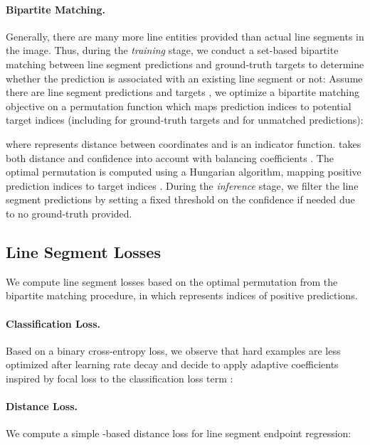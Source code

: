 \documentclass[final]{cvpr}
\begin{document}
\paragraph{Bipartite Matching.} Generally, there are many more line entities provided than actual line segments in the image. Thus, during the \textit{training} stage, we conduct a set-based bipartite matching between line segment predictions and ground-truth targets to determine whether the prediction is associated with an existing line segment or not: Assume there are  line segment predictions  and  targets , we optimize a bipartite matching objective on a permutation function  which maps prediction indices  to potential target indices  (including  for ground-truth targets and  for unmatched predictions):
\vspace{-3mm}

where  represents  distance between coordinates and  is an indicator function.  takes both distance and confidence into account with balancing coefficients . The optimal permutation  is computed using a Hungarian algorithm, mapping  positive prediction indices to target indices . During the \textit{inference} stage, we filter the  line segment predictions by setting a fixed threshold on the confidence  if needed due to no ground-truth provided.

\subsection{Line Segment Losses}
\vspace{-2mm}
We compute line segment losses based on the optimal permutation  from the bipartite matching procedure, in which  represents indices of positive predictions.
\vspace{-2mm}
\paragraph{Classification Loss.} Based on a binary cross-entropy loss, we observe that hard examples are less optimized after learning rate decay and decide to apply adaptive coefficients inspired by focal loss \cite{FocalLoss17} to the classification loss term :
\vspace{-3mm}


\paragraph{Distance Loss.} We compute a simple -based distance loss for line segment endpoint regression:
\end{document}
